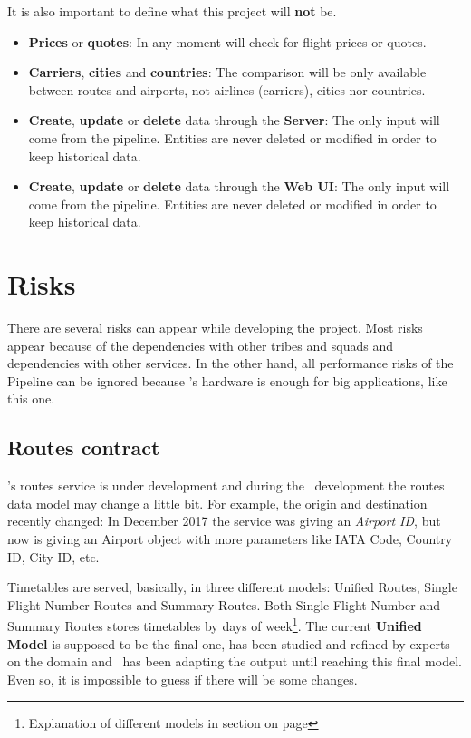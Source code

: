 It is also important to define what this project will \textbf{not} be.

\begin{itemize}
  \item \textbf{Prices} or \textbf{quotes}: In any moment will check for flight prices or quotes.
  \item \textbf{Carriers}, \textbf{cities} and \textbf{countries}: The comparison will be only available between routes and airports, not airlines (carriers), cities nor countries.
  \item \textbf{Create}, \textbf{update} or \textbf{delete} data through the \textbf{Server}: The only input will come from the pipeline. Entities are never deleted or modified in order to keep historical data.
  \item \textbf{Create}, \textbf{update} or \textbf{delete} data through the \textbf{Web UI}: The only input will come from the pipeline. Entities are never deleted or modified in order to keep historical data.
\end{itemize}


\section{Risks}

There are several risks can appear while developing the project. Most risks appear because of the dependencies with other tribes and squads and dependencies with other services. In the other hand, all performance risks of the Pipeline can be ignored because \company's hardware is enough for big applications, like this one.

\subsection{Routes contract}

\squad's routes service is under development and during the \thesis\ development the routes data model may change a little bit. For example, the origin and destination recently changed: In December 2017 the service was giving an \textit{Airport ID}, but now is giving an Airport object with more parameters like IATA Code\cite{iata_code}, Country ID, City ID, etc.

Timetables are served, basically, in three different models: Unified Routes, Single Flight Number Routes and Summary Routes. Both Single Flight Number and Summary Routes stores timetables by days of week\footnote{Explanation of different models in section  on page \pageref{routes_model}}. The current \textbf{Unified Model} is supposed to be the final one, has been studied and refined by experts on the domain and \squad\ has been adapting the output until reaching this final model. Even so, it is impossible to guess if there will be some changes.

